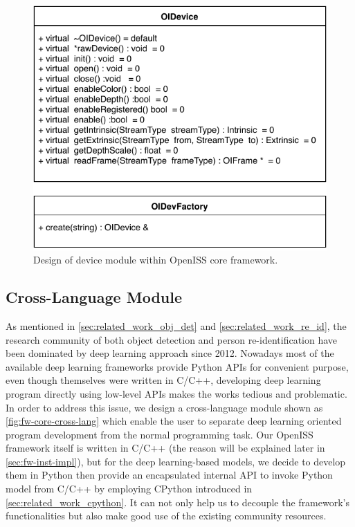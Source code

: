 \begin{figure}
    \centering
    \includegraphics[scale=0.8]{figures/framework_core_device.pdf}
    \caption{Design of device module within OpenISS core framework.}
    \label{fig:fw-core-device}
\end{figure}

\subsection{Cross-Language Module}
\label{sec:fw-design-core-cross-lang}

As mentioned in \autoref{sec:related_work_obj_det} and
\autoref{sec:related_work_re_id}, the research community of both 
object detection and person re-identification have been dominated by deep 
learning approach since 2012.
Nowadays most of the available deep learning frameworks provide Python APIs for
convenient purpose, even though themselves were written in C/C++, developing
deep learning program directly using low-level APIs makes the works tedious and
problematic.
In order to address this issue, we design a cross-language module shown as
\autoref{fig:fw-core-cross-lang} which
enable the user to separate deep learning oriented program development from the
normal programming task. Our OpenISS framework itself is written in C/C++ (the
reason will be explained later in \autoref{sec:fw-inst-impl}), but for the deep
learning-based
models, we decide to develop them in Python then provide an encapsulated
internal API to invoke Python model from C/C++ by employing CPython introduced
in \autoref{sec:related_work_cpython}. It can not only help us to decouple the
framework's functionalities but also make good use of the existing community
resources.

